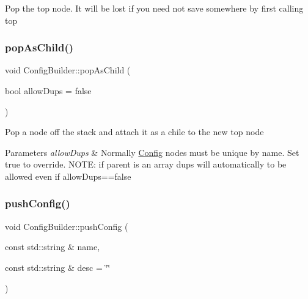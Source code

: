 Pop the top node. It will be lost if you need not save somewhere by first calling top \mbox{\label{classtheoria_1_1config_1_1ConfigBuilder_acd995045c0bf17d35da9573cf53ec791}} 
\subsubsection{\texorpdfstring{pop\+As\+Child()}{popAsChild()}}
{\footnotesize\ttfamily void Config\+Builder\+::pop\+As\+Child (\begin{DoxyParamCaption}\item[{bool}]{allow\+Dups = {\ttfamily false} }\end{DoxyParamCaption})}

Pop a node off the stack and attach it as a chile to the new top node 
\begin{DoxyParams}{Parameters}
{\em allow\+Dups} & Normally \hyperlink{classtheoria_1_1config_1_1Config}{Config} nodes must be unique by name. Set true to override. N\+O\+TE\+: if parent is an array dups will automatically to be allowed even if allow\+Dups==false \\
\hline
\end{DoxyParams}
\mbox{\label{classtheoria_1_1config_1_1ConfigBuilder_ad7542393581c33259aae6d07d11391dd}} 
\subsubsection{\texorpdfstring{push\+Config()}{pushConfig()}\hspace{0.1cm}{\footnotesize\ttfamily [1/2]}}
{\footnotesize\ttfamily void Config\+Builder\+::push\+Config (\begin{DoxyParamCaption}\item[{const std\+::string \&}]{name,  }\item[{const std\+::string \&}]{desc = {\ttfamily \char`\"{}\char`\"{}} }\end{DoxyParamCaption})}

